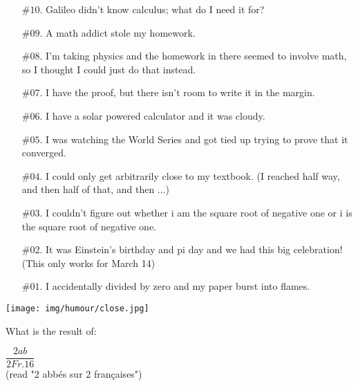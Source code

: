 	\begin{itemize}
	
		\item[$\text{\#}10.$] Galileo didn't know calculus; what do I need it for?
	
		\item[$\text{\#}09.$] A math addict stole my homework.
	
		\item[$\text{\#}08.$] I'm taking physics and the homework in there seemed to involve math, so I thought I could just do that instead.
	
		\item[$\text{\#}07.$] I have the proof, but there isn't room to write it in the margin.
	
		\item[$\text{\#}06.$] I have a solar powered calculator and it was cloudy.
	
		\item[$\text{\#}05.$] I was watching the World Series and got tied up trying to prove that it converged.
	
		\item[$\text{\#}04.$] I could only get arbitrarily close to my textbook. (I reached half way, and then half of that, and then ...)
	
		\item[$\text{\#}03.$] I couldn't figure out whether i am the square root of negative one or i is the square root of negative one.
	
		\item[$\text{\#}02.$] It was Einstein's birthday and pi day and we had this big celebration! (This only works for March 14)
	
		\item[$\text{\#}01.$] I accidentally divided by zero and my paper burst into flames.	
	\end{itemize}

	\begin{center}\underline{\hspace{5 cm}}\end{center}
	\begin{center}
		\texttt{[image: img/humour/close.jpg]}	
	\end{center}
	\begin{center}\underline{\hspace{5 cm}}\end{center}
	
	\pagebreak
	What is the result of:
	\begin{center}
		 $\dfrac{2ab}{2Fr.16}$\\
		(read "2 abbés sur 2 françaises")
	\end{center} 

